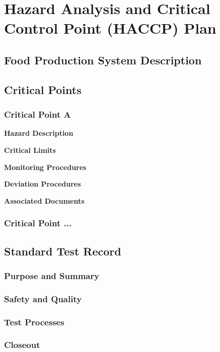 \section{Hazard Analysis and Critical Control Point (HACCP) Plan}

\subsection{Food Production System Description}

\subsection{Critical Points}

\subsubsection{Critical Point A}
\textbf{Hazard Description}

\textbf{Critical Limits}

\textbf{Monitoring Procedures}

\textbf{Deviation Procedures}

\textbf{Associated Documents}


\subsubsection{Critical Point ...}

\subsection{Standard Test Record}

\subsubsection{Purpose and Summary}

\subsubsection{Safety and Quality}

\subsubsection{Test Processes}


\subsubsection{Closeout}